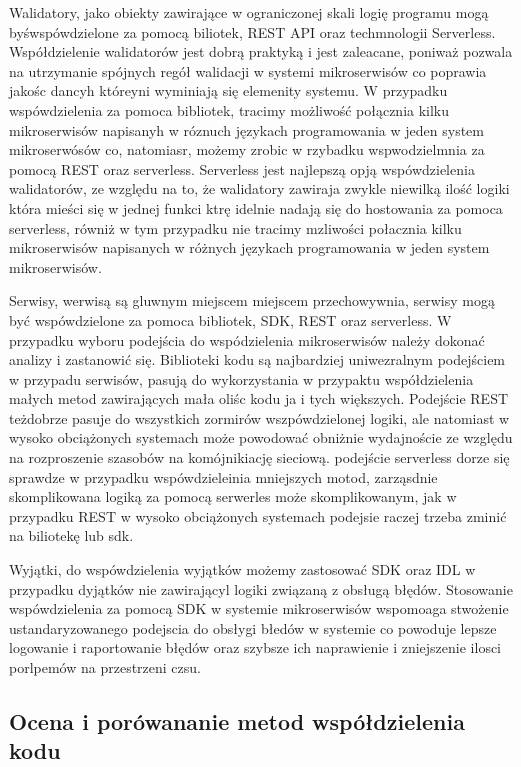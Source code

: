 \documentclass[runningheads,12pt]{llncs} \usepackage{graphicx} \usepackage{todonotes} \usepackage{fancyhdr} \usepackage{lipsum} \usepackage[T1]{fontenc} \usepackage[provide=*,english,polish]{babel}
\begin{document}
Walidatory, jako obiekty zawirające w ograniczonej skali logię programu mogą byśwspówdzielone za pomocą biliotek, REST API oraz techmnologii Serverless. Współdzielenie walidatorów jest dobrą praktyką i jest zaleacane, poniważ pozwala na utrzymanie spójnych regół walidacji w systemi mikroserwisów co poprawia jakośc dancyh któreyni wyminiają się elemenity systemu. W przypadku wspówdzielenia za pomoca bibliotek, tracimy możliwość połącznia kilku mikroserwisów napisanyh w róznuch językach programowania w jeden system mikroserwósów co, natomiasr, możemy zrobic w rzybadku wspwodzielmnia za pomocą REST oraz serverless. Serverless jest najlepszą opją wspówdzielenia walidatorów, ze względu na to, że walidatory zawiraja zwykle niewilką ilość logiki która mieści się w jednej funkci ktrę idelnie nadają się do hostowania za pomoca serverless, równiż w tym przypadku nie tracimy mzliwości połacznia kilku mikroserwisów napisanych w różnych językach programowania w jeden system mikroserwisów.

Serwisy, werwisą są gluwnym miejscem miejscem przechowywnia, serwisy mogą być wspówdzielone za pomoca bibliotek, SDK, REST oraz serverless. W przypadku wyboru podejścia do wspódzielenia mikroserwisów należy dokonać analizy i zastanowić się. Biblioteki kodu są najbardziej uniwezralnym podejściem w przypadu serwisów, pasują do wykorzystania w przypaktu współdzielenia małych metod zawirających mała oliśc kodu ja i tych większych. Podejście REST teżdobrze pasuje do wszystkich zormirów wszpówdzielonej logiki, ale natomiast w wysoko obciążonych systemach może powodować obniżnie wydajnoście ze względu na rozproszenie szasobów na komójnikiację sieciową. podejście serverless dorze się sprawdze w przypadku wspówdzieleinia mniejszych motod, zarząsdnie skomplikowana logiką za pomocą serwerles może skomplikowanym, jak w przypadku REST w wysoko obciążonych systemach podejsie raczej trzeba zminić na biliotekę lub sdk. 

Wyjątki, do wspówdzielenia wyjątków możemy zastosować SDK oraz IDL w przypadku dyjątków nie zawirającyl logiki związaną z obsługą błędów. Stosowanie wspówdzielenia za pomocą SDK w systemie mikroserwisów wspomoaga stwożenie ustandaryzowanego podejscia do obsłygi błedów w systemie co powoduje lepsze logowanie i raportowanie błędów oraz szybsze ich naprawienie i zniejszenie ilosci porlpemów na przestrzeni czsu.  

\subsection{Ocena i porówananie metod współdzielenia kodu}
\end{document}
